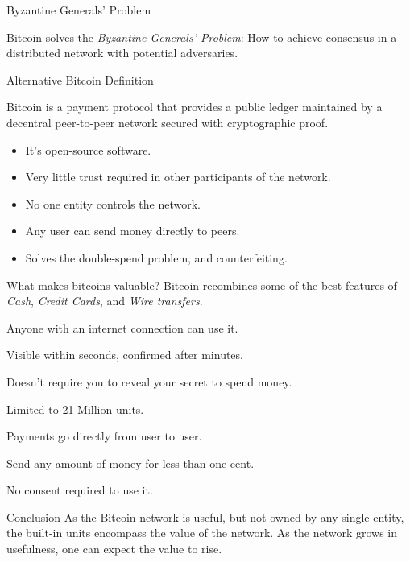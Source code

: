 \documentclass[12pt, usepdftitle=false]{beamer}
\newcommand{\backupbegin}{
   \newcounter{finalframe}
   \setcounter{finalframe}{\value{framenumber}}
}
\begin{document}
\appendix
\backupbegin

\begin{frame}{Byzantine Generals' Problem}

	Bitcoin solves the \emph{Byzantine Generals' Problem}: How to achieve consensus in a distributed network with potential adversaries.
\end{frame}


\begin{frame}{Alternative Bitcoin Definition}
\begin{definition}
Bitcoin is a \alert<3>{payment protocol} that provides a \alert<4>{public ledger} maintained by a \alert<5>{decentral} \alert<6>{peer-to-peer network} \alert<7>{secured with cryptographic proof}.
\end{definition}\pause

\begin{itemize}
\item<3->It's open-source software.
\item<4->Very little trust required in other participants of the network.
\item<5->No one entity controls the network.
\item<6->Any user can send money directly to peers.
\item<7->Solves the double-spend problem, and counterfeiting.
\end{itemize}
\end{frame}


\begin{frame}{What makes bitcoins valuable?}
Bitcoin recombines some of the best features of \emph{Cash}, \emph{Credit Cards}, and \emph{Wire transfers}.
	\begin{description}
		\pause\item[Global] Anyone with an internet connection can use it.
		\pause\item[Fast] Visible within seconds, confirmed after minutes.
		\pause\item[Secure] Doesn't require you to reveal your secret to spend money.
		\pause\item[Scarce] Limited to 21 Million units.
		\pause\item[Peer-to-peer] Payments go directly from user to user.
		\pause\item[Cheap] Send any amount of money for less than one cent.
		\pause\item[Open] No consent required to use it.
	\end{description}\pause
	\begin{block}{Conclusion}
	As the Bitcoin network is useful, but not owned by any single entity, the built-in units encompass the value of the network. As the network grows in usefulness, one can expect the value to rise.
	\end{block}
\end{frame}
\end{document}
